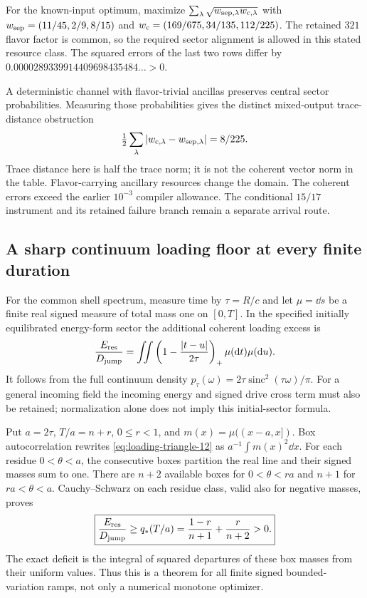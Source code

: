 For the known-input optimum, maximize
$\sum_\lambda\sqrt{w_{{\rm sep},\lambda}w_{{\rm c},\lambda}}$ with
$w_{\rm sep}=(11/45,2/9,8/15)$ and
$w_{\rm c}=(169/675,34/135,112/225)$. The retained $321$ flavor factor is
common, so the required sector alignment is allowed in this stated
resource class. The squared errors of the last two rows differ by
$0.0000289339914409698435484\ldots>0$.

A deterministic channel with flavor-trivial ancillas preserves central
sector probabilities. Measuring those probabilities gives the distinct
mixed-output trace-distance obstruction
\begin{equation}
 \tfrac12\sum_\lambda|w_{{\rm c},\lambda}-w_{{\rm sep},\lambda}|
 =8/225.
\end{equation}
Trace distance here is half the trace norm; it is not the coherent vector
norm in the table. Flavor-carrying ancillary resources change the domain.
The coherent errors exceed the earlier $10^{-3}$ compiler allowance.
The conditional $15/17$ instrument and its retained failure branch remain
a separate arrival route.

\subsection{A sharp continuum loading floor at every finite duration}
\label{sec:loading-floor-12}

For the common shell spectrum, measure time by $\tau=R/c$ and let
$\mu=\dd s$ be a finite real signed measure of total mass one on $[0,T]$.
In the specified initially equilibrated energy-form sector the additional
coherent loading excess is
\begin{equation}
 \frac{E_{\rm res}}{D_{\rm jump}}
 =\iint\left(1-\frac{|t-u|}{2\tau}\right)_+
                      \mu(\mathrm{d} t)\mu(\mathrm{d} u).
\label{eq:loading-triangle-12}
\end{equation}
It follows from the full continuum density
$p_\tau(\omega)=2\tau\operatorname{sinc}^2(\tau\omega)/\pi$.
For a general incoming field the incoming energy and signed drive cross
term must also be retained; normalization alone does not imply this
initial-sector formula.

Put $a=2\tau$, $T/a=n+r$, $0\le r<1$, and
$m(x)=\mu((x-a,x])$. Box autocorrelation rewrites
\eqref{eq:loading-triangle-12} as $a^{-1}\int m(x)^2\dd x$.
For each residue $0<\theta<a$, the consecutive boxes partition the real
line and their signed masses sum to one. There are $n+2$ available boxes
for $0<\theta<ra$ and $n+1$ for $ra<\theta<a$. Cauchy--Schwarz on each
residue class, valid also for negative masses, proves
\begin{equation}
 \boxed{\frac{E_{\rm res}}{D_{\rm jump}}\ge
       q_*(T/a)=\frac{1-r}{n+1}+\frac r{n+2}>0.}
\label{eq:loading-floor-12}
\end{equation}
The exact deficit is the integral of squared departures of these box
masses from their uniform values. Thus this is a theorem for all finite
signed bounded-variation ramps, not only a numerical monotone optimizer.

